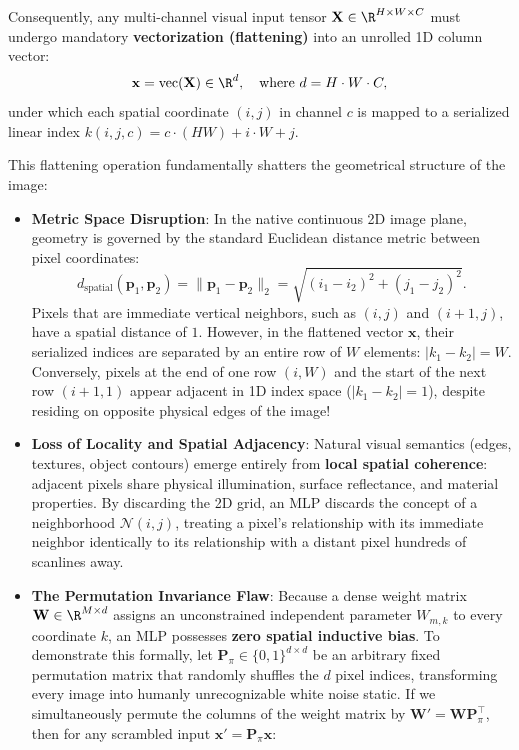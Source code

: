 Consequently, any multi-channel visual input tensor $\mathbf{X} \in \R^{H \times W \times C}$ must undergo mandatory \textbf{vectorization (flattening)} into an unrolled 1D column vector:
\begin{equation}
\mathbf{x} = \operatorname{vec}(\mathbf{X}) \in \R^{d}, \quad \text{where } d = H \cdot W \cdot C,
\label{eq:flattening_transformation}
\end{equation}
under which each spatial coordinate $(i, j)$ in channel $c$ is mapped to a serialized linear index $k(i, j, c) = c \cdot (HW) + i \cdot W + j$.

This flattening operation fundamentally shatters the geometrical structure of the image:
\begin{itemize}[leftmargin=*]
  \item \textbf{Metric Space Disruption}: In the native continuous 2D image plane, geometry is governed by the standard Euclidean distance metric between pixel coordinates:
  \begin{equation}
  d_{\text{spatial}}(\mathbf{p}_1, \mathbf{p}_2) = \|\mathbf{p}_1 - \mathbf{p}_2\|_2 = \sqrt{(i_1 - i_2)^2 + (j_1 - j_2)^2}.
  \end{equation}
  Pixels that are immediate vertical neighbors, such as $(i, j)$ and $(i+1, j)$, have a spatial distance of $1$. However, in the flattened vector $\mathbf{x}$, their serialized indices are separated by an entire row of $W$ elements: $|k_1 - k_2| = W$. Conversely, pixels at the end of one row $(i, W)$ and the start of the next row $(i+1, 1)$ appear adjacent in 1D index space ($|k_1 - k_2| = 1$), despite residing on opposite physical edges of the image!
  \item \textbf{Loss of Locality and Spatial Adjacency}: Natural visual semantics (edges, textures, object contours) emerge entirely from \textbf{local spatial coherence}: adjacent pixels share physical illumination, surface reflectance, and material properties. By discarding the 2D grid, an MLP discards the concept of a neighborhood $\mathcal{N}(i, j)$, treating a pixel's relationship with its immediate neighbor identically to its relationship with a distant pixel hundreds of scanlines away.
  \item \textbf{The Permutation Invariance Flaw}: Because a dense weight matrix $\mathbf{W} \in \R^{M \times d}$ assigns an unconstrained independent parameter $W_{m, k}$ to every coordinate $k$, an MLP possesses \textbf{zero spatial inductive bias}. To demonstrate this formally, let $\mathbf{P}_\pi \in \{0, 1\}^{d \times d}$ be an arbitrary fixed permutation matrix that randomly shuffles the $d$ pixel indices, transforming every image into humanly unrecognizable white noise static. If we simultaneously permute the columns of the weight matrix by $\mathbf{W}' = \mathbf{W}\mathbf{P}_\pi^\top$, then for any scrambled input $\mathbf{x}' = \mathbf{P}_\pi \mathbf{x}$:

\end{itemize}
